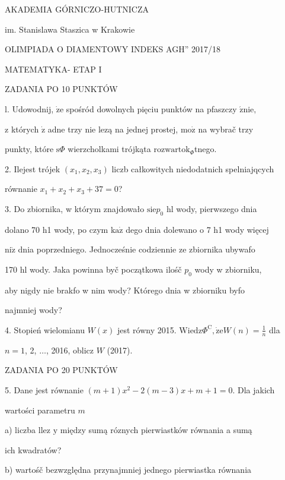 \documentclass[a4paper,12pt]{article}
\begin{document}
AKADEMIA GÓRNICZO-HUTNICZA

im. Stanislawa Staszica w Krakowie

OLIMPIADA O DIAMENTOWY INDEKS AGH'' 2017/18

MATEMATYKA- ETAP I

ZADANIA PO 10 PUNKTÓW

l. Udowodnij, $\dot{\mathrm{z}}\mathrm{e}$ spośród dowolnych pięciu punktów na pfaszczy $\acute{\mathrm{z}}\mathrm{n}\mathrm{i}\mathrm{e},$

z których $\dot{\mathrm{z}}$ adne trzy nie lezą na jednej prostej, $\mathrm{m}\mathrm{o}\dot{\mathrm{z}}$ na wybrač trzy

punkty, które $\mathrm{s}\Phi$ wierzcholkami trójkąta $\mathrm{r}\mathrm{o}\mathrm{z}\mathrm{w}\mathrm{a}\mathrm{r}\mathrm{t}\mathrm{o}\mathrm{k}_{\Phi}$tnego.

2. Ilejest trójek $(x_{1},x_{2},x_{3})$ liczb całkowitych niedodatnich spelniajqcych

równanie $x_{1}+x_{2}+x_{3}+37=0$?

3. Do zbiornika, w którym znajdowało $\mathrm{s}\mathrm{i}\mathrm{e}p_{0}$ hl wody, pierwszego dnia

dolano 70 h1 wody, po czym $\mathrm{k}\mathrm{a}\dot{\mathrm{z}}$ dego dnia dolewano o 7 h1 wody więcej

$\mathrm{n}\mathrm{i}\dot{\mathrm{z}}$ dnia poprzedniego. Jednocześnie codziennie ze zbiornika ubywafo

170 hl wody. Jaka powinna byč początkowa ilośč $p_{0}$ wody w zbiorniku,

aby nigdy nie brakfo w nim wody? Którego dnia w zbiorniku byfo

najmniej wody?

4. Stopień wielomianu $W(x)$ jest równy 2015. $\mathrm{W}\mathrm{i}\mathrm{e}\mathrm{d}\mathrm{z}\Phi^{\mathrm{C}}, \displaystyle \dot{\mathrm{z}}\mathrm{e}W(n)=\frac{1}{n}$ dla

$n=1$, 2, $\ldots$, 2016, oblicz $W$ (2017).

ZADANIA PO 20 PUNKTÓW

5. Dane jest równanie $(m+1)x^{2}-2(m-3)x+m+1=0$. Dla jakich

wartości parametru $m$

a) liczba llez $\mathrm{y}$ między sumą róznych pierwiastków równania a sumą

ich kwadratów?

b) wartośč bezwzględna przynajmniej jednego pierwiastka równania
\end{document}
